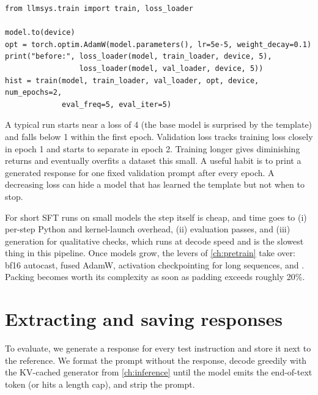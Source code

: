 \begin{lstlisting}[caption={SFT reuses the pretraining loop; only the data differs.},label={lst:instruct:train}]
from llmsys.train import train, loss_loader

model.to(device)
opt = torch.optim.AdamW(model.parameters(), lr=5e-5, weight_decay=0.1)
print("before:", loss_loader(model, train_loader, device, 5),
                 loss_loader(model, val_loader, device, 5))
hist = train(model, train_loader, val_loader, opt, device, num_epochs=2,
             eval_freq=5, eval_iter=5)
\end{lstlisting}

A typical run starts near a loss of 4 (the base model is surprised by the template) and
falls below 1 within the first epoch. Validation loss tracks training loss closely in
epoch 1 and starts to separate in epoch 2. Training longer gives diminishing returns
and eventually overfits a dataset this small. A useful habit is to print a generated
response for one fixed validation prompt after every epoch. A decreasing loss can hide
a model that has learned the template but not when to stop.

\begin{systemslens}
For short SFT runs on small models the step itself is cheap, and time goes to
(i) per-step Python and kernel-launch overhead, (ii) evaluation passes, and
(iii) generation for qualitative checks, which runs at decode speed and is the slowest
thing in this pipeline. Once models grow, the levers of \cref{ch:pretrain} take over:
bf16 autocast, fused AdamW, activation checkpointing for long sequences, and
. Packing becomes worth its complexity as soon as padding exceeds
roughly 20\%.
\end{systemslens}

\section{Extracting and saving responses}\label{sec:instruct:extract}

To evaluate, we generate a response for every test instruction and store it next to the
reference. We format the prompt without the response, decode greedily with the KV-cached
generator from \cref{ch:inference} until the model emits the end-of-text token (or hits
a length cap), and strip the prompt.

